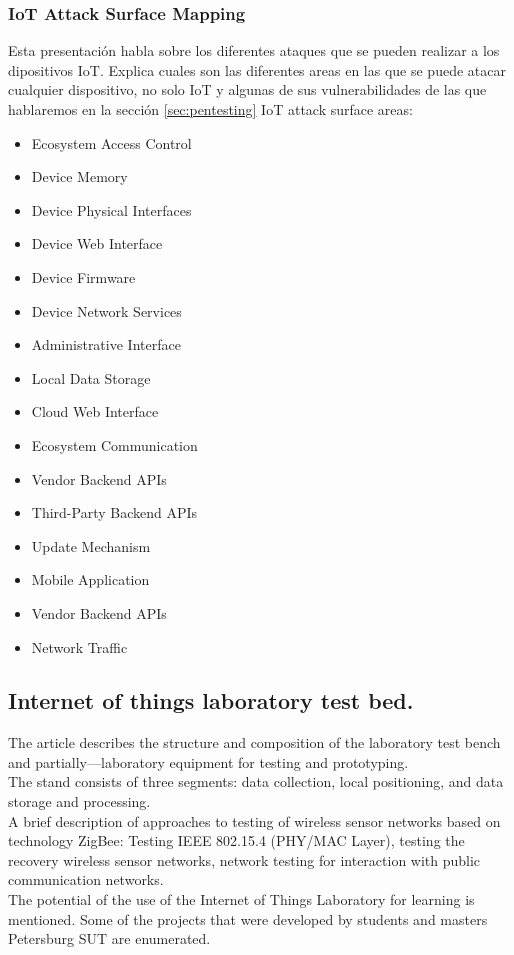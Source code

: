 \subsubsection{IoT Attack Surface Mapping}\cite{Presentation1}
Esta presentación habla sobre los diferentes ataques que se pueden realizar a los dipositivos IoT.
Explica cuales son las diferentes areas en las que se puede atacar cualquier dispositivo, no solo IoT y algunas de sus vulnerabilidades de las que hablaremos en la sección \ref{sec:pentesting}
IoT attack surface areas:
\begin{itemize}
	\item Ecosystem Access Control
	\item Device Memory
	\item Device Physical Interfaces
	\item Device Web Interface
	\item Device Firmware
	\item Device Network Services
	\item Administrative Interface
	\item Local Data Storage
	\item Cloud Web Interface
	\item Ecosystem Communication
	\item Vendor Backend APIs
	\item Third-Party Backend APIs
	\item Update Mechanism
	\item Mobile Application
	\item Vendor Backend APIs
	\item Network Traffic
\end{itemize}

\subsection{Internet of things laboratory test bed.}\cite{Paper12}
The article describes the structure and composition of the laboratory test bench and partially—laboratory equipment for testing and prototyping.\\
The stand consists of three segments: data collection, local positioning, and data storage and processing.\\
A brief description of approaches to testing of wireless sensor networks based on technology ZigBee: Testing IEEE 802.15.4 (PHY/MAC Layer), testing the recovery wireless sensor networks, network testing for interaction with public communication networks.\\
The potential of the use of the Internet of Things Laboratory for learning is mentioned. Some of the projects that were developed by students and masters Petersburg SUT are enumerated.\\

